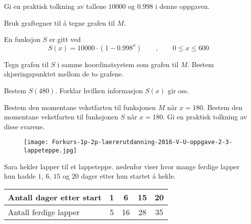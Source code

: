 \begin{oppgaver}
   Gi en praktisk tolkning av tallene $\num{10000}$ og $\num{0.998}$ i
  denne oppgaven.
\end{oppgaver}

\begin{oppgaver}
   Bruk graftegner til å tegne grafen til $M$.
\end{oppgaver}

En funksjon $S$ er gitt ved
%
\begin{equation*}
  S(x) = \num{10000} \cdot (1 - \num{0.998}^x)
  \qquad , \qquad
  0 \leq x \leq 600
\end{equation*}

\begin{oppgaver}
   Tegn grafen til $S$ i samme koordinatsystem som grafen til $M$.
  Bestem skjæringspunktet mellom de to grafene.
\end{oppgaver}

\begin{oppgaver}
   Bestem $S(480)$. Forklar hvilken informasjon  $S(x)$ gir oss.
\end{oppgaver}

\begin{oppgaver}
   Bestem den momentane vekstfarten til funksjonen $M$ når $x=180$.
  Bestem den momentane vekstfarten til funksjonen $S$ når $x=180$. Gi en
  praktisk tolkning av disse svarene.
\end{oppgaver}


\Oppgave[5]

\begin{figure}[H]
  \centering
  \texttt{[image: Forkurs-1p-2p-laererutdanning-2016-V-U-oppgave-2-3-lappeteppe.jpg]}
\end{figure}

Sara hekler lapper til et lappeteppe. nedenfor viser hvor mange ferdige lapper
hun hadde $1$, $6$, $15$ og $20$ dager etter hun startet å hekle.

\begin{table}[H]
  \centering
  \label{tab:Forkurs-1p-2p-laererutdanning-2016-V-U-oppgave-2-3}
  \begin{tabular}{|l| *{4}{S[table-format=2.0]|}} \hline
    \Cellcolor Antall dager etter start & 1 &  6 & 15 & 20 \\ \hline
    \Cellcolor Antall ferdige lapper    & 5 & 16 & 28 & 35 \\ \hline
  \end{tabular}
\end{table}

